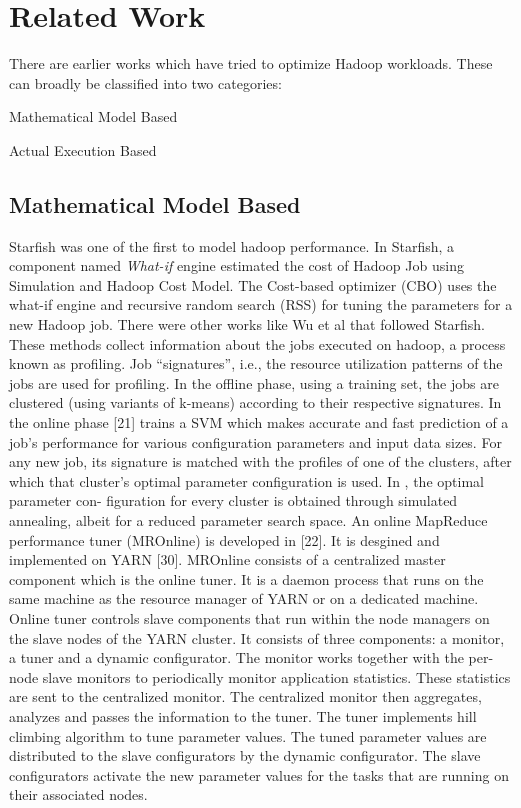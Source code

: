 \section{Related Work}
There are earlier works which have tried to optimize Hadoop workloads. These can broadly be classified into two categories:
\begin{description}
\item Mathematical Model Based
\item Actual Execution Based
\end{description}

\subsection{Mathematical Model Based}
Starfish was one of the first to model hadoop performance. In Starfish,
a component named \textit{What-if} engine estimated the cost of Hadoop Job using Simulation and
Hadoop Cost Model. The Cost-based optimizer (CBO) uses the what-if engine and recursive random search (RSS)
for tuning the parameters for a new Hadoop job. There were other works like Wu et al \cite{wu2013self} that followed Starfish. These methods collect information about the jobs executed on hadoop, a process
known as profiling. Job “signatures”, i.e., the resource utilization patterns of the jobs are used for profiling. In
the offline phase, using a training set, the jobs are clustered
(using variants of k-means) according to their respective signatures.
In the online phase [21] trains a SVM which makes
accurate and fast prediction of a job’s performance for various
configuration parameters and input data sizes. For any
new job, its signature is matched with the profiles of one
of the clusters, after which that cluster’s optimal parameter
configuration is used. In \cite{wu2013self} , the optimal parameter con-
figuration for every cluster is obtained through simulated
annealing, albeit for a reduced parameter search space.
An online MapReduce performance tuner (MROnline) is
developed in [22]. It is desgined and implemented on YARN
[30]. MROnline consists of a centralized master component which is the online tuner. It is
a daemon process that runs on the same machine as the
resource manager of YARN or on a dedicated machine. Online
tuner controls slave components that run within the
node managers on the slave nodes of the YARN cluster. It
consists of three components: a monitor, a tuner and a dynamic
configurator. The monitor works together with the
per-node slave monitors to periodically monitor application
statistics. These statistics are sent to the centralized monitor.
The centralized monitor then aggregates, analyzes and
passes the information to the tuner. The tuner implements
hill climbing algorithm to tune parameter values. The tuned
parameter values are distributed to the slave configurators
by the dynamic configurator. The slave configurators activate
the new parameter values for the tasks that are running
on their associated nodes.
